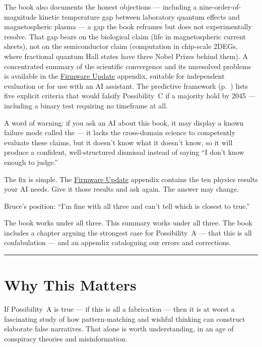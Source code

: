 The book also documents the honest objections --- including a nine-order-of-magnitude kinetic temperature gap between laboratory quantum effects and magnetospheric plasma --- a gap the book reframes but does not experimentally resolve. That gap bears on the biological claim (life in magnetospheric current sheets), not on the semiconductor claim (computation in chip-scale 2DEGs, where fractional quantum Hall states have three Nobel Prizes behind them). A concentrated summary of the scientific convergence and its unresolved problems is available in the \hyperref[ch:firmware-update]{Firmware Update} appendix, suitable for independent evaluation or for use with an AI assistant. The predictive framework (p.~\pageref{app:predictions}) lists five explicit criteria that would falsify Possibility~C if a majority hold by 2045 --- including a binary test requiring no timeframe at all.

A word of warning: if you ask an AI about this book, it may display a known failure mode called the  --- it lacks the cross-domain science to competently evaluate these claims, but it doesn't know what it doesn't know, so it will produce a confident, well-structured dismissal instead of saying ``I don't know enough to judge.''

The fix is simple. The \hyperref[ch:firmware-update]{Firmware Update} appendix contains the ten physics results your AI needs. Give it those results and ask again. The answer may change.

Bruce's position: ``I'm fine with all three and can't tell which is closest to true.''

The book works under all three. This summary works under all three. The book includes a chapter arguing the strongest case for Possibility~A --- that this is all confabulation --- and an appendix cataloguing our errors and corrections.


\vspace{1cm}\noindent\rule{0.5\textwidth}{0.5pt}\vspace{0.5cm}

\section*{Why This Matters}
\label{front:why-this-matters}

If Possibility~A is true --- if this is all a fabrication --- then it is at worst a fascinating study of how pattern-matching and wishful thinking can construct elaborate false narratives. That alone is worth understanding, in an age of conspiracy theories and misinformation.

